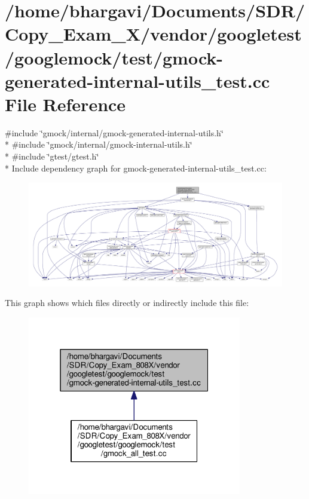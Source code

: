 \hypertarget{gmock-generated-internal-utils__test_8cc}{}\section{/home/bhargavi/\+Documents/\+S\+D\+R/\+Copy\+\_\+\+Exam\+\_\+X/vendor/googletest/googlemock/test/gmock-\/generated-\/internal-\/utils\+\_\+test.cc File Reference}
\label{gmock-generated-internal-utils__test_8cc}
{\ttfamily \#include \char`\"{}gmock/internal/gmock-\/generated-\/internal-\/utils.\+h\char`\"{}}\\*
{\ttfamily \#include \char`\"{}gmock/internal/gmock-\/internal-\/utils.\+h\char`\"{}}\\*
{\ttfamily \#include \char`\"{}gtest/gtest.\+h\char`\"{}}\\*
Include dependency graph for gmock-\/generated-\/internal-\/utils\+\_\+test.cc\+:
\nopagebreak
\begin{figure}[H]
\begin{center}
\leavevmode
\includegraphics[width=350pt]{gmock-generated-internal-utils__test_8cc__incl}
\end{center}
\end{figure}
This graph shows which files directly or indirectly include this file\+:
\nopagebreak
\begin{figure}[H]
\begin{center}
\leavevmode
\includegraphics[width=265pt]{gmock-generated-internal-utils__test_8cc__dep__incl}
\end{center}
\end{figure}
